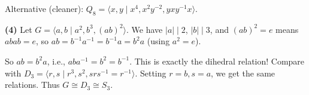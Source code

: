\documentclass{report}
\begin{document}
\begin{solution}
Alternative (cleaner): \(Q_8 = \langle x, y \mid x^4, x^2 y^{-2}, yxy^{-1}x \rangle\).

\textbf{(4)} Let \(G = \langle a, b \mid a^2, b^3, (ab)^2 \rangle\). We have \(|a| \mid 2\), \(|b| \mid 3\), and \((ab)^2 = e\) means \(abab = e\), so \(ab = b^{-1}a^{-1} = b^{-1}a = b^2 a\) (using \(a^2 = e\)).

So \(ab = b^2 a\), i.e., \(aba^{-1} = b^2 = b^{-1}\). This is exactly the dihedral relation! Compare with \(D_3 = \langle r, s \mid r^3, s^2, srs^{-1} = r^{-1} \rangle\). Setting \(r = b, s = a\), we get the same relations. Thus \(G \cong D_3 \cong S_3\).
\end{solution}
\end{document}
